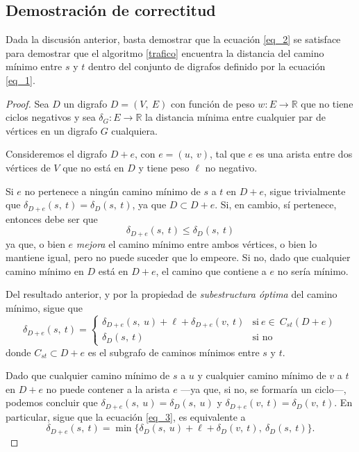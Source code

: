 \subsection{Demostración de correctitud}\label{correctitud}  

Dada la discusión anterior, basta demostrar que la ecuación \ref{eq_2} se satisface para demostrar que el algoritmo \ref{trafico} encuentra la distancia del camino mínimo entre $s$ y $t$ dentro del conjunto de digrafos definido por la ecuación \ref{eq_1}.

\begin{proof} 
    Sea $D$ un digrafo $D = (V,\ E)$ con función de peso $w: E \to \mathbb{R}$ que no tiene ciclos negativos y sea  $\delta_G : E \to \mathbb{R}$ la distancia mínima entre cualquier par de vértices en un digrafo $G$ cualquiera.

    Consideremos el digrafo $D+e$, con $e = (u,\ v)$, tal que $e$ es una arista entre dos vértices de $V$ que no está en $D$ y tiene peso $\ell$ no negativo. 
    
    Si $e$ no pertenece a ningún camino mínimo de $s$ a $t$ en $D + e$, sigue trivialmente que $\delta_{D + e}(s,\ t) = \delta_{D}(s,\ t)$, ya que $D \subset D + e$. Si, en cambio, sí pertenece, entonces debe ser que
    \begin{equation*}
        \delta_{D + e}(s,\ t) \leq \delta_{D}(s,\ t)
    \end{equation*} 
    ya que, o bien $e$ \textit{mejora} el camino mínimo entre ambos vértices, o bien lo mantiene igual, pero no puede suceder que lo empeore. Si no, dado que cualquier camino mínimo en $D$ está en $D + e$, el camino que contiene a $e$ no sería mínimo. 
    
    Del resultado anterior, y por la propiedad de \textit{subestructura óptima} del camino mínimo, sigue que
    \begin{equation}\label{eq_3}
        \delta_{D + e}(s,\ t) = \begin{cases}
            \delta_{D + e}(s,\ u) + \ell + \delta_{D + e}(v,\ t) &\text{si}\ e \in\ C_{st}(D+e)\\
            \delta_{D}(s,\ t) &\text{si no}
        \end{cases}
    \end{equation}
    donde $C_{st} \subset D + e$ es el subgrafo de caminos mínimos entre $s$ y $t$.

    Dado que cualquier camino mínimo de $s$ a $u$ y cualquier camino mínimo de $v$ a $t$ en $D + e$ no puede contener a la arista $e$ ---ya que, si no, se formaría un ciclo---, podemos concluir que $ \delta_{D + e}(s,\ u) = \delta_{D}(s,\ u) $ y $ \delta_{D + e}(v,\ t) = \delta_{D}(v,\ t)$. En particular, sigue que la ecuación \ref{eq_3}, es equivalente a
    \begin{equation*}
        \delta_{D + e}(s,\ t) = \min\{\delta_{D}(s,\ u) + \ell + \delta_{D}(v,\ t),\ \delta_{D}(s,\ t)\}.
    \end{equation*}
\end{proof}
    
